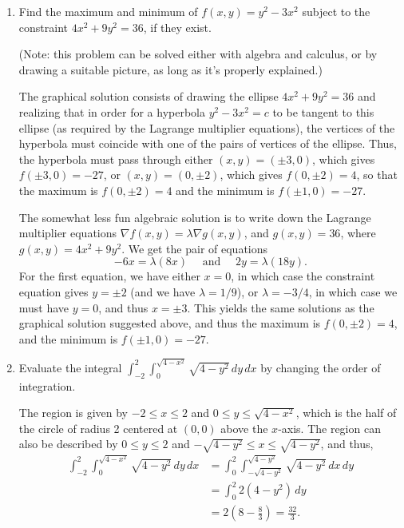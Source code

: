 \documentclass[12pt]{article}
\newcommand{\points}[1]{\marginpar{\hspace{24pt}[#1]}}
\newcommand{\di}{\displaystyle}
\begin{document}
\begin{enumerate}
\item Find the maximum and minimum of $f(x,y)=y^2-3x^2$ subject to the constraint $4x^2+9y^2=36$, if they exist. \points{7}

(Note: this problem can be solved either with algebra and calculus, or by drawing a suitable picture, as long as it's properly explained.)

\bigskip

The graphical solution consists of drawing the ellipse $4x^2+9y^2=36$ and realizing that in order for a hyperbola $y^2-3x^2=c$ to be tangent to this ellipse (as required by the Lagrange multiplier equations), the vertices of the hyperbola must coincide with one of the pairs of vertices of the ellipse. Thus, the hyperbola must pass through either $(x,y) = (\pm 3, 0)$, which gives $f(\pm 3, 0) = -27$, or $(x,y) = (0,\pm 2)$, which gives $f(0,\pm 2) = 4$, so that the maximum is $f(0,\pm 2)=4$ and the minimum is $f(\pm 1, 0) = -27$.

\medskip

The somewhat less fun algebraic solution is to write down the Lagrange multiplier equations $\nabla f(x,y) = \lambda \nabla g(x,y)$, and $g(x,y)=36$, where $g(x,y) = 4x^2+9y^2$. We get the pair of equations
\[
 -6x = \lambda (8x) \quad \text{ and } \quad 2y = \lambda(18y).
\]
For the first equation, we have either $x=0$, in which case the constraint equation gives $y=\pm 2$ (and we have $\lambda = 1/9$), or $\lambda =-3/4$, in which case we must have $y=0$, and thus $x=\pm 3$. This yields the same solutions as the graphical solution suggested above, and thus the maximum is $f(0,\pm 2)=4$, and the minimum is $f(\pm 1,0) = -27$.

\bigskip

\newpage

\item Evaluate the integral $\di \int_{-2}^2\int_0^{\sqrt{4-x^2}}\sqrt{4-y^2}\, dy\,dx$ by changing the order of integration. \points{6}

\bigskip

The region is given by $-2\leq x\leq 2$ and $0\leq y\leq \sqrt{4-x^2}$, which is the half of the circle of radius 2 centered at $(0,0)$ above the $x$-axis. The region can also be described by $0\leq y\leq 2$ and $-\sqrt{4-y^2}\leq x\leq\sqrt{4-y^2}$, and thus,
\begin{align*}
 \int_{-2}^2\int_0^{\sqrt{4-x^2}}\sqrt{4-y^2}\, dy\,dx & = \int_0^2\int_{-\sqrt{4-y^2}}^{\sqrt{4-y^2}}\sqrt{4-y^2}\,dx\,dy\\
& = \int_0^2 2(4-y^2)\,dy\\
& = 2\left(8-\frac{8}{3}\right) = \frac{32}{3}.
\end{align*}



\end{enumerate}
\end{document}
